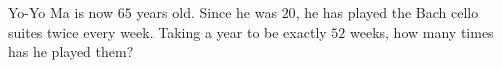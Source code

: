 Yo-Yo Ma is now $65$ years old. Since he was $20$, he has played the Bach cello suites twice every week. Taking a year to be exactly $52$ weeks, how many times has he played them?

